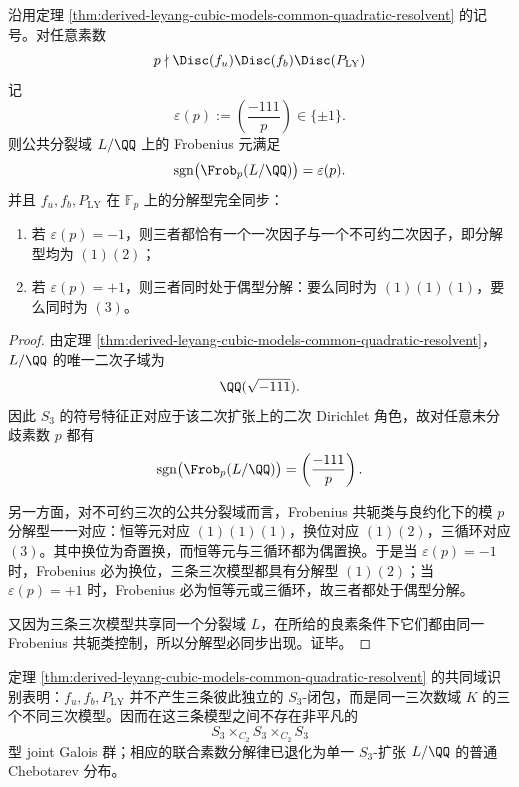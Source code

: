 \begin{corollary}\label{cor:derived-leyang-cubic-models-parity-synchronization}
沿用定理 \ref{thm:derived-leyang-cubic-models-common-quadratic-resolvent} 的记号。对任意素数
\[
p\nmid \Disc(f_u)\Disc(f_b)\Disc(P_{\mathrm{LY}})
\]
记
\[
\varepsilon(p):=\left(\frac{-111}{p}\right)\in\{\pm 1\}.
\]
则公共分裂域 \(L/\QQ\) 上的 Frobenius 元满足
\[
\operatorname{sgn}\bigl(\Frob_p(L/\QQ)\bigr)=\varepsilon(p).
\]
并且 \(f_u,f_b,P_{\mathrm{LY}}\) 在 \(\mathbb F_p\) 上的分解型完全同步：
\begin{enumerate}
  \item 若 \(\varepsilon(p)=-1\)，则三者都恰有一个一次因子与一个不可约二次因子，即分解型均为 \((1)(2)\)；
  \item 若 \(\varepsilon(p)=+1\)，则三者同时处于偶型分解：要么同时为 \((1)(1)(1)\)，要么同时为 \((3)\)。
\end{enumerate}
\end{corollary}
\begin{proof}
由定理 \ref{thm:derived-leyang-cubic-models-common-quadratic-resolvent}，\(L/\QQ\) 的唯一二次子域为
\[
\QQ(\sqrt{-111}).
\]
因此 \(S_3\) 的符号特征正对应于该二次扩张上的二次 Dirichlet 角色，故对任意未分歧素数 \(p\) 都有
\[
\operatorname{sgn}\bigl(\Frob_p(L/\QQ)\bigr)=\left(\frac{-111}{p}\right).
\]

另一方面，对不可约三次的公共分裂域而言，Frobenius 共轭类与良约化下的模 \(p\) 分解型一一对应：恒等元对应 \((1)(1)(1)\)，换位对应 \((1)(2)\)，三循环对应 \((3)\)。其中换位为奇置换，而恒等元与三循环都为偶置换。于是当 \(\varepsilon(p)=-1\) 时，Frobenius 必为换位，三条三次模型都具有分解型 \((1)(2)\)；当 \(\varepsilon(p)=+1\) 时，Frobenius 必为恒等元或三循环，故三者都处于偶型分解。

又因为三条三次模型共享同一个分裂域 \(L\)，在所给的良素条件下它们都由同一 Frobenius 共轭类控制，所以分解型必同步出现。证毕。
\end{proof}

\begin{remark}\label{rem:derived-leyang-cubic-models-no-fiber-product}
定理 \ref{thm:derived-leyang-cubic-models-common-quadratic-resolvent} 的共同域识别表明：\(f_u,f_b,P_{\mathrm{LY}}\) 并不产生三条彼此独立的 \(S_3\)-闭包，而是同一三次数域 \(K\) 的三个不同三次模型。因而在这三条模型之间不存在非平凡的
\[
S_3\times_{C_2}S_3\times_{C_2}S_3
\]
型 joint Galois 群；相应的联合素数分解律已退化为单一 \(S_3\)-扩张 \(L/\QQ\) 的普通 Chebotarev 分布。
\end{remark}
